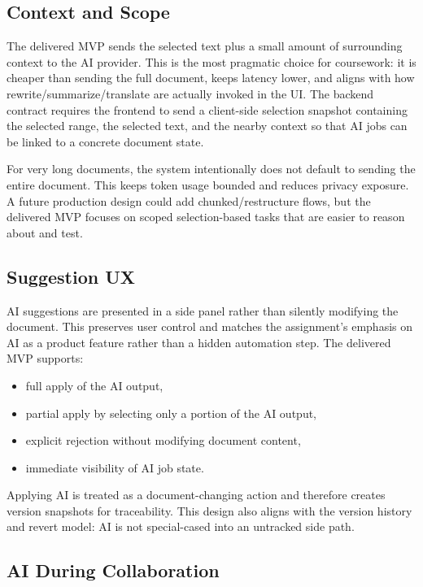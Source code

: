 \subsection{Context and Scope}

The delivered MVP sends the selected text plus a small amount of surrounding context to the AI provider.
This is the most pragmatic choice for coursework: it is cheaper than sending the full document, keeps
latency lower, and aligns with how rewrite/summarize/translate are actually invoked in the UI. The
backend contract requires the frontend to send a client-side selection snapshot containing the selected
range, the selected text, and the nearby context so that AI jobs can be linked to a concrete document
state.

For very long documents, the system intentionally does not default to sending the entire document. This
keeps token usage bounded and reduces privacy exposure. A future production design could add
chunked/restructure flows, but the delivered MVP focuses on scoped selection-based tasks that are easier
to reason about and test.

\subsection{Suggestion UX}

AI suggestions are presented in a side panel rather than silently modifying the document. This preserves
user control and matches the assignment's emphasis on AI as a product feature rather than a hidden
automation step. The delivered MVP supports:

\begin{itemize}
  \item full apply of the AI output,
  \item partial apply by selecting only a portion of the AI output,
  \item explicit rejection without modifying document content,
  \item immediate visibility of AI job state.
\end{itemize}

Applying AI is treated as a document-changing action and therefore creates version snapshots for
traceability. This design also aligns with the version history and revert model: AI is not special-cased
 into an untracked side path.

\subsection{AI During Collaboration}

